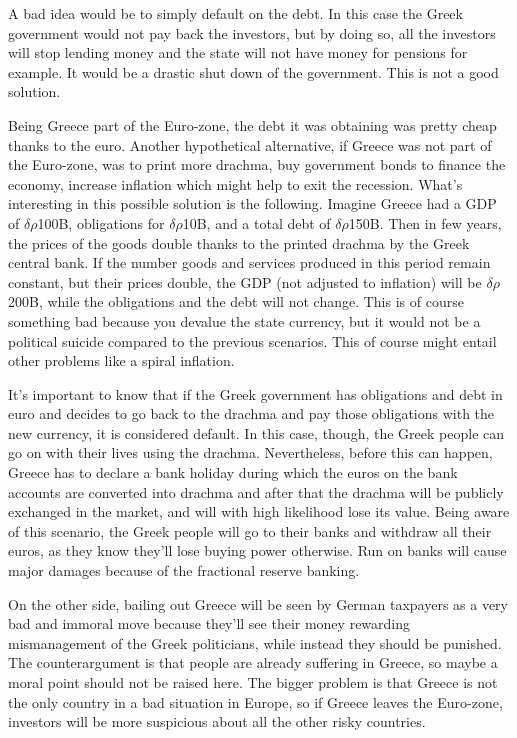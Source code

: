 A bad idea would be to simply default on the debt. In this case the Greek government would not pay back the investors, but by doing so, all the investors will stop lending money and the state will not have money for pensions for example. It would be a drastic shut down of the government. This is not a good solution.

Being Greece part of the Euro-zone, the debt it was obtaining was pretty cheap thanks to the euro. Another hypothetical alternative, if Greece was not part of the Euro-zone, was to print more drachma, buy government bonds to finance the economy, increase inflation which might help to exit the recession. What's interesting in this possible solution is the following. Imagine Greece had a GDP of $\delta\rho$100B, obligations for $\delta\rho$10B, and a total debt of $\delta\rho$150B. Then in few years, the prices of the goods double thanks to the printed drachma by the Greek central bank. If the number goods and services produced in this period remain constant, but their prices double, the GDP (not adjusted to inflation) will be $\delta\rho$200B, while the obligations and the debt will not change. This is of course something bad because you devalue the state currency, but it would not be a political suicide compared to the previous scenarios. This of course might entail other problems like a spiral inflation.

It's important to know that if the Greek government has obligations and debt in euro and decides to go back to the drachma and pay those obligations with the new currency, it is considered default. In this case, though, the Greek people can go on with their lives using the drachma. Nevertheless, before this can happen, Greece has to declare a bank holiday during which the euros on the bank accounts are converted into drachma and after that the drachma will be publicly exchanged in the market, and will with high likelihood lose its value. Being aware of this scenario, the Greek people will go to their banks and withdraw all their euros, as they know they'll lose buying power otherwise. Run on banks will cause major damages because of the fractional reserve banking.

On the other side, bailing out Greece will be seen by German taxpayers as a very bad and immoral move because they'll see their money rewarding mismanagement of the Greek politicians, while instead they should be punished. The counterargument is that people are already suffering in Greece, so maybe a moral point should not be raised here. The bigger problem is that Greece is not the only country in a bad situation in Europe, so if Greece leaves the Euro-zone, investors will be more suspicious about all the other risky countries.

